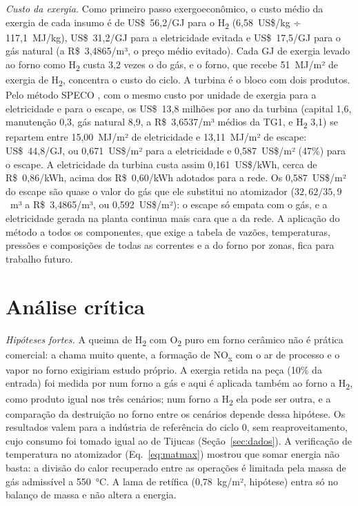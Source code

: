 \documentclass[10pt,a4paper,twocolumn]{article}
\newcommand{\Ht}{H\textsubscript{2}}
\newcommand{\Ot}{O\textsubscript{2}}
\begin{document}
\textit{Custo da exergia.} Como primeiro passo exergoeconômico, o custo médio da exergia de cada insumo é de US\$~56,2/GJ para o \Ht{} (6,58~US\$/kg ÷ 117,1~MJ/kg), US\$~31,2/GJ para a eletricidade evitada e US\$~17,5/GJ para o gás natural (a R\$~3,4865/m³, o preço médio evitado). Cada GJ de exergia levado ao forno como \Ht{} custa 3,2 vezes o do gás, e o forno, que recebe 51~MJ/m² de exergia de \Ht, concentra o custo do ciclo. A turbina é o bloco com dois produtos. Pelo método SPECO \cite{lazzaretto2006}, com o mesmo custo por unidade de exergia para a eletricidade e para o escape, os US\$~13,8 milhões por ano da turbina (capital 1,6, manutenção 0,3, gás natural 8,9, a R\$~3,6537/m³ médios da TG1, e \Ht{} 3,1) se repartem entre 15,00~MJ/m² de eletricidade e 13,11~MJ/m² de escape: US\$~44,8/GJ, ou 0,671~US\$/m² para a eletricidade e 0,587~US\$/m² (47\%) para o escape. A eletricidade da turbina custa assim 0,161~US\$/kWh, cerca de R\$~0,86/kWh, acima dos R\$~0,60/kWh adotados para a rede. Os 0,587~US\$/m² do escape são quase o valor do gás que ele substitui no atomizador ($32{,}62/35{,}9$~m³ a R\$~3,4865/m³, ou 0,592~US\$/m²): o escape só empata com o gás, e a eletricidade gerada na planta continua mais cara que a da rede. A aplicação do método a todos os componentes, que exige a tabela de vazões, temperaturas, pressões e composições de todas as correntes e a do forno por zonas, fica para trabalho futuro.

\section{Análise crítica}\label{sec:critica}

\textit{Hipóteses fortes.} A queima de \Ht{} com \Ot{} puro em forno cerâmico não é prática comercial: a chama muito quente, a formação de NO\textsubscript{x} com o ar de processo e o vapor no forno exigiriam estudo próprio. A exergia retida na peça (10\% da entrada) foi medida por \cite{ferrer2019} num forno a gás e aqui é aplicada também ao forno a \Ht, como produto igual nos três cenários; num forno a \Ht{} ela pode ser outra, e a comparação da destruição no forno entre os cenários depende dessa hipótese. Os resultados valem para a indústria de referência do ciclo 0, sem reaproveitamento, cujo consumo foi tomado igual ao de Tijucas (Seção~\ref{sec:dados}). A verificação de temperatura no atomizador (Eq.~\eqref{eq:matmax}) mostrou que somar energia não basta: a divisão do calor recuperado entre as operações é limitada pela massa de gás admissível a 550~°C. A lama de retífica (0,78~kg/m², hipótese) entra só no balanço de massa e não altera a energia.
\end{document}
